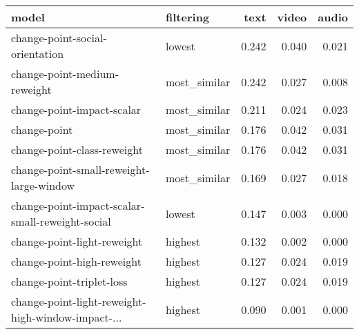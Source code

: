 \begin{tabular}{llrrr}
\toprule
                                             model &    filtering &  text &  video &  audio \\
\midrule
                   change-point-social-orientation &       lowest & 0.242 &  0.040 &  0.021 \\
                      change-point-medium-reweight & most\_similar & 0.242 &  0.027 &  0.008 \\
                        change-point-impact-scalar & most\_similar & 0.211 &  0.024 &  0.023 \\
                                      change-point & most\_similar & 0.176 &  0.042 &  0.031 \\
                       change-point-class-reweight & most\_similar & 0.176 &  0.042 &  0.031 \\
          change-point-small-reweight-large-window & most\_similar & 0.169 &  0.027 &  0.018 \\
  change-point-impact-scalar-small-reweight-social &       lowest & 0.147 &  0.003 &  0.000 \\
                       change-point-light-reweight &      highest & 0.132 &  0.002 &  0.000 \\
                        change-point-high-reweight &      highest & 0.127 &  0.024 &  0.019 \\
                         change-point-triplet-loss &      highest & 0.127 &  0.024 &  0.019 \\
change-point-light-reweight-high-window-impact-... &      highest & 0.090 &  0.001 &  0.000 \\
\bottomrule
\end{tabular}
